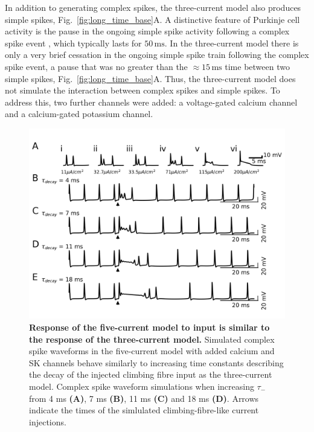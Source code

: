 \documentclass[twocolumn]{svjour3}          %
\newcommand{\mse}{\,\mathrm{ms}}
\begin{document}
In addition to generating complex spikes, the three-current model also
produces simple spikes, Fig.~\ref{fig:long_time_base}A. A distinctive
feature of Purkinje cell activity is the pause in the ongoing simple
spike activity following a complex spike event
\citep{BellGrimm1969,GranitPhillips1956,Thach1967}, which typically
lasts for $50\mse$. In the three-current model there is only a very
brief cessation in the ongoing simple spike train following the
complex spike event, a pause that was no greater than the $\approx
15\mse$ time between two simple spikes,
Fig.~\ref{fig:long_time_base}A. Thus, the three-current model does not
simulate the interaction between complex spikes and simple spikes. To
address this, two further channels were added: a voltage-gated calcium
channel and a calcium-gated potassium channel.



\begin{figure}[!ht]
  \includegraphics[width=\linewidth]{Figure6.png}
\caption{\textbf{Response of the five-current model to input is
    similar to the response of the three-current model.} Simulated
  complex spike waveforms in the five-current model with added calcium
  and SK channels behave similarly to increasing time constants
  describing the decay of the injected climbing fibre input as the
  three-current model. Complex spike waveform simulations when
  increasing $\tau_-$ from 4 ms \textbf{(A)}, 7 ms \textbf{(B)}, 11 ms
  \textbf{(C)} and 18 ms \textbf{(D)}. Arrows indicate the times of
  the simlulated climbing-fibre-like current injections.}
\label{S2_Fig}
\end{figure}
\end{document}
